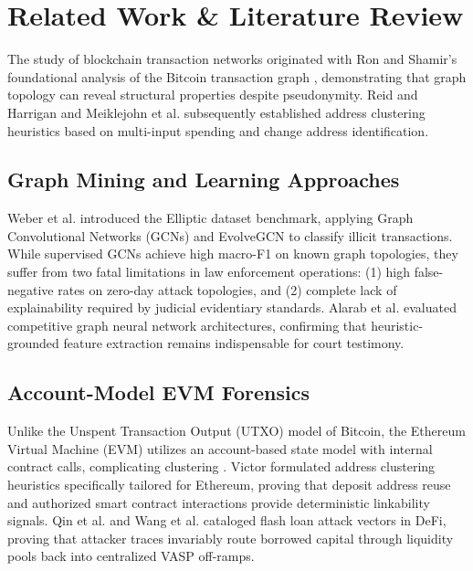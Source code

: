\documentclass[10pt,twocolumn,a4paper]{article}
\begin{document}
\section{Related Work \& Literature Review}
The study of blockchain transaction networks originated with Ron and Shamir's foundational analysis of the Bitcoin transaction graph \cite{ron2013quantitative}, demonstrating that graph topology can reveal structural properties despite pseudonymity. Reid and Harrigan \cite{reid2013analysis} and Meiklejohn et al. \cite{meiklejohn2013fistful} subsequently established address clustering heuristics based on multi-input spending and change address identification.

\subsection{Graph Mining and Learning Approaches}
Weber et al. \cite{weber2019anti} introduced the Elliptic dataset benchmark, applying Graph Convolutional Networks (GCNs) and EvolveGCN to classify illicit transactions. While supervised GCNs achieve high macro-F1 on known graph topologies, they suffer from two fatal limitations in law enforcement operations: (1) high false-negative rates on zero-day attack topologies, and (2) complete lack of explainability required by judicial evidentiary standards. Alarab et al. \cite{alarab2020competence} evaluated competitive graph neural network architectures, confirming that heuristic-grounded feature extraction remains indispensable for court testimony.

\subsection{Account-Model EVM Forensics}
Unlike the Unspent Transaction Output (UTXO) model of Bitcoin, the Ethereum Virtual Machine (EVM) utilizes an account-based state model with internal contract calls, complicating clustering \cite{kiffer2018under}. Victor \cite{victor2020address} formulated address clustering heuristics specifically tailored for Ethereum, proving that deposit address reuse and authorized smart contract interactions provide deterministic linkability signals. Qin et al. \cite{qin2021quantifying} and Wang et al. \cite{wang2022towards} cataloged flash loan attack vectors in DeFi, proving that attacker traces invariably route borrowed capital through liquidity pools back into centralized VASP off-ramps.
\end{document}
